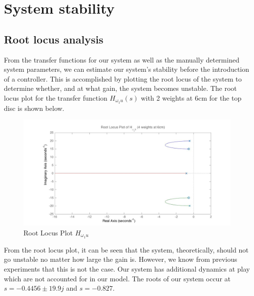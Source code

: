 \documentclass[11pt,titlepage]{article}
\begin{document}
\section{System stability}
	\subsection{Root locus analysis}
	From the transfer functions for our system as well as the manually determined system parameters, we can estimate our system's stability before the introduction of a controller. This is accomplished by plotting the root locus of the system to determine whether, and at what gain, the system becomes unstable. The root locus plot for the transfer function $H_{\omega_{1}u}(s)$ with 2 weights at 6cm for the top disc is shown below. 
	\begin{figure}[H]
        \centering
        \includegraphics[trim={6cm 0 1cm 1cm},clip,origin=c,scale=0.26]{rlplot_4w_6cm_2disks}
        \caption{Root Locus Plot $H_{\omega_{1}u}$}
        \label{fig:disc_sys}
    \end{figure}
     From the root locus plot, it can be seen that the system, theoretically, should not go unstable no matter how large the gain is. However, we know from previous experiments that this is not the case. Our system has additional dynamics at play which are not accounted for in our model. The roots of our system occur at $s=-0.4456 \pm 19.9j$ and $s=-0.827$.\\
\end{document}
